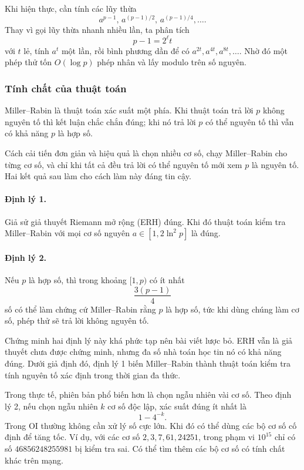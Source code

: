 \documentclass[11pt]{article}
\begin{document}
Khi hiện thực, cần tính các lũy thừa
\[
  a^{p-1},\,a^{(p-1)/2},\,a^{(p-1)/4},\ldots.
\]
Thay vì gọi lũy thừa nhanh nhiều lần, ta phân tích
\[
  p-1=2^\ell t
\]
với \(t\) lẻ, tính \(a^t\) một lần, rồi bình phương dần để có
\(a^{2t},a^{4t},a^{8t},\ldots\). Nhờ đó một phép thử tốn \(O(\log p)\) phép
nhân và lấy modulo trên số nguyên.

\subsubsection{Tính chất của thuật toán}

Miller--Rabin là thuật toán xác suất một phía. Khi thuật toán trả lời \(p\)
không nguyên tố thì kết luận chắc chắn đúng; khi nó trả lời \(p\) có thể
nguyên tố thì vẫn có khả năng \(p\) là hợp số.

Cách cải tiến đơn giản và hiệu quả là chọn nhiều cơ số, chạy Miller--Rabin cho
từng cơ số, và chỉ khi tất cả đều trả lời có thể nguyên tố mới xem \(p\) là
nguyên tố. Hai kết quả sau làm cho cách làm này đáng tin cậy.

\paragraph{Định lý 1.}
Giả sử giả thuyết Riemann mở rộng (ERH) đúng. Khi đó thuật toán kiểm tra
Miller--Rabin với mọi cơ số nguyên \(a\in[1,2\ln^2 p]\) là đúng.

\paragraph{Định lý 2.}
Nếu \(p\) là hợp số, thì trong khoảng \([1,p)\) có ít nhất
\[
  \frac{3(p-1)}{4}
\]
số có thể làm chứng cứ Miller--Rabin rằng \(p\) là hợp số, tức khi dùng chúng
làm cơ số, phép thử sẽ trả lời không nguyên tố.

Chứng minh hai định lý này khá phức tạp nên bài viết lược bỏ. ERH vẫn là giả
thuyết chưa được chứng minh, nhưng đa số nhà toán học tin nó có khả năng đúng.
Dưới giả định đó, định lý 1 biến Miller--Rabin thành thuật toán kiểm tra tính
nguyên tố xác định trong thời gian đa thức.

Trong thực tế, phiên bản phổ biến hơn là chọn ngẫu nhiên vài cơ số. Theo định
lý 2, nếu chọn ngẫu nhiên \(k\) cơ số độc lập, xác suất đúng ít nhất là
\[
  1-4^{-k}.
\]
Trong OI thường không cần xử lý số cực lớn. Khi đó có thể dùng các bộ cơ số cố
định để tăng tốc. Ví dụ, với các cơ số \(2,3,7,61,24251\), trong phạm vi
\(10^{15}\) chỉ có số \(46856248255981\) bị kiểm tra sai. Có thể tìm thêm các
bộ cơ số có tính chất khác trên mạng.
\end{document}
